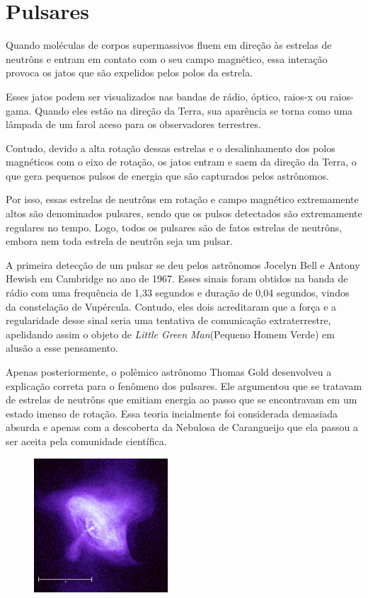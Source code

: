 \documentclass[article,12pt,oneside,a4paper,english,brazil,sumario=tradicional]{abntex2}
\begin{document}
\section{Pulsares}
Quando moléculas de corpos supermassivos fluem em direção às estrelas de neutrôns e entram em contato com o seu campo magnético, essa interação provoca os jatos que são expelidos pelos polos da estrela.

Esses jatos podem ser visualizados nas bandas de rádio, óptico, raios-x ou raios-gama. Quando eles estão na direção da Terra, sua aparência se torna como uma lâmpada de um farol aceso para os observadores terrestres.

Contudo, devido a alta rotação dessas estrelas e o desalinhamento dos polos magnéticos com o eixo de rotação, os jatos entram e saem da direção da Terra, o que gera pequenos pulsos de energia que são capturados pelos astrônomos.

Por isso, essas estrelas de neutrôns em rotação e campo magnético extremamente altos são denominados pulsares, sendo que os pulsos detectados são extremamente regulares no tempo. Logo, todos os pulsares são de fatos estrelas de neutrôns, embora nem toda estrela de neutrôn seja um pulsar. 

A primeira detecção de um pulsar se deu pelos astrônomos Jocelyn Bell e Antony Hewish em Cambridge no ano de 1967. Esses sinais foram obtidos na banda de rádio com uma frequência de 1,33 segundos e duração de 0,04 segundos, vindos da constelação de Vupércula. Contudo, eles dois acreditaram  que a força e a regularidade desse sinal seria uma tentativa de comunicação extraterrestre, apelidando assim o objeto de \textit{Little Green Man}(Pequeno Homem Verde) em alusão a esse pensamento.

Apenas posteriormente, o polêmico astrônomo Thomas Gold desenvolveu a explicação correta para o fenômeno dos pulsares. Ele argumentou que se tratavam de estrelas de neutrôns que emitiam energia ao passo que se encontravam em um estado imenso de rotação. Essa teoria incialmente foi considerada demasiada absurda e apenas com a descoberta da Nebulosa de Carangueijo que ela passou a ser aceita pela comunidade científica.

\begin{figure}[h]
	\centering
	\includegraphics[width=0.6\linewidth,height=5cm]{crab2pul.jpg}
\end{figure}
\end{document}
